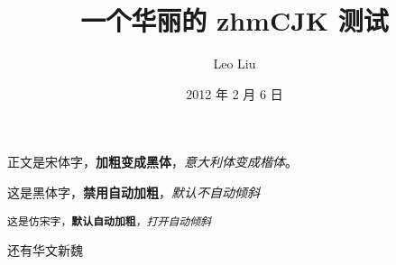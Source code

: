 \documentclass[12pt,a4paper]{article}
\title{\bfseries 一个华丽的 zhmCJK 测试}
\author{Leo Liu}
\date{2012 年 2 月 6 日}
\begin{document}
\maketitle

正文是宋体字，\textbf{加粗变成黑体}，\textit{意大利体变成楷体}。

\textsf{这是黑体字，\textbf{禁用自动加粗}，\textsl{默认不自动倾斜}}

\texttt{这是仿宋字，\textbf{默认自动加粗}，\textsl{打开自动倾斜}}

{还有华文新魏}
\end{document}
